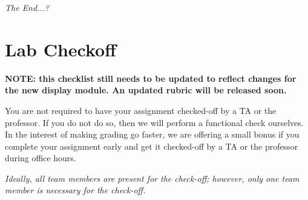 \textit{The End...?}

\newpage\appendix

\section{Lab Checkoff}

\textbf{NOTE: this checklist still needs to be updated to reflect changes for the new display module. An updated rubric will be released soon.}

You are not required to have your assignment checked-off by a TA or the
professor. If you do not do so, then we will perform a functional check
ourselves. In the interest of making grading go faster, we are offering a small
bonus %
if you complete your assignment early and get it checked-off by a TA or the
professor during office hours.

\textit{Ideally, all team members are present for the check-off; however, only
one team member is necessary for the check-off.}

